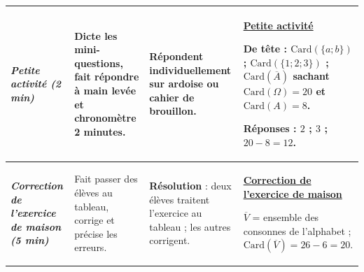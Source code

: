 \documentclass[10pt]{article}
\newcommand{\titreR}[1]{\underline{\textcolor{rougetitre}{\bfseries #1}}}
\newcommand{\seance}[1]{\fcolorbox{bleuseance}{bleufond}{\textcolor{bleuseance}{\bfseries #1}}}
\newcommand{\moment}[1]{\textbf{\itshape #1}}
\begin{document}
\begin{longtable}{|p{2.35cm}|p{5.35cm}|p{4.55cm}|p{13.85cm}|}
\hline
\seance{SEANCE 4} \newline \moment{Petite activité (2 min)} &
Dicte les mini-questions, fait répondre à main levée et chronomètre 2 minutes. &
Répondent individuellement sur ardoise ou cahier de brouillon. &
\titreR{Petite activité} \par
De tête : $\mathrm{Card}(\{a;b\})$ ; \; $\mathrm{Card}(\{1;2;3\})$ ; \;
$\mathrm{Card}(\overline{A})$ sachant $\mathrm{Card}(\Omega)=20$ et $\mathrm{Card}(A)=8$. \par
\textbf{Réponses :} $2$ ; \; $3$ ; \; $20-8=12$. \\ \hline

\moment{Correction de l'exercice de maison (5 min)} &
Fait passer des élèves au tableau, corrige et précise les erreurs. &
\textbf{Résolution} : deux élèves traitent l'exercice au tableau ; les autres corrigent. &
\titreR{Correction de l'exercice de maison} \par
$\overline{V}$ = ensemble des consonnes de l'alphabet ; \;
$\mathrm{Card}(\overline{V})=26-6=20$. \\ \hline


\end{longtable}
\end{document}
